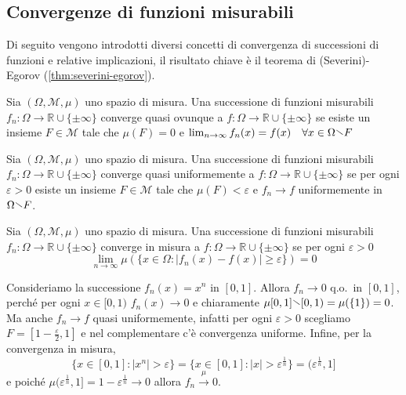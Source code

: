 \subsection{Convergenze di funzioni misurabili}
Di seguito vengono introdotti diversi concetti di convergenza di successioni di funzioni e relative implicazioni, 
il risultato chiave è il teorema di (Severini)-Egorov (\ref{thm:severini-egorov}).
\begin{definition}
    Sia \((\Omega, \mathcal{M}, \mu)\) uno spazio di misura. Una successione di
    funzioni misurabili \(f_{n} : \Omega \to \mathbb{R} \cup \{\pm \infty\} \)
    converge quasi ovunque a \(f : \Omega \to \mathbb{R} \cup \{\pm \infty\} \)
    se esiste un insieme \(F \in \mathcal{M}\) tale che \(\mu(F) = 0\) e
    \(\lim_{n \to \infty} f_{n}(x) = f(x) \quad \forall x \in \Omega \sminus F\)
\end{definition}
\begin{definition}
    Sia \((\Omega, \mathcal{M}, \mu)\) uno spazio di misura. Una successione di
    funzioni misurabili \(f_{n} : \Omega \to \mathbb{R} \cup \{\pm \infty\} \)
    converge quasi uniformemente a \(f : \Omega \to \mathbb{R} \cup \{\pm \infty\} \)
    se per ogni \(\varepsilon > 0\) esiste un insieme \(F \in \mathcal{M}\) tale
    che \(\mu(F) < \varepsilon\) e \(f_{n} \to f\) uniformemente in \(\Omega
    \sminus F\).
\end{definition}
\begin{definition}
    Sia \((\Omega, \mathcal{M}, \mu)\) uno spazio di misura. Una successione di
    funzioni misurabili \(f_{n} : \Omega \to \mathbb{R} \cup \{\pm \infty\} \)
    converge in misura a \(f : \Omega \to \mathbb{R} \cup \{\pm \infty\} \) se
    per ogni \(\varepsilon > 0\) 
    \[
        \lim_{n \to \infty} \mu(\{x \in \Omega : |f_{n}(x) - f(x)| \ge
        \varepsilon\}) = 0
    \]
\end{definition}
\begin{example}
    Consideriamo la successione \(f_{n}{(x)} = x^{n}\) in \([0,1]\). Allora
    \(f_{n} \to 0\) q.o.~in \([0, 1]\), perché per ogni \(x \in [0, 1)\)
    \(f_{n}{(x)} \to 0\) e chiaramente \(\mu{[0,1] \sminus {[0,1)}} =
    \mu{(\{1\} )} = 0\). Ma anche \(f_{n} \to f\) quasi uniformemente, infatti
    per ogni \(\varepsilon > 0\) scegliamo \(F=[1-\frac{\varepsilon}{2} , 1]\) e
    nel complementare c'è convergenza uniforme. Infine, per la convergenza in
    misura, \[
        \{x \in [0,1] : |x^{n}| > \varepsilon\} = \{x \in
        [0,1] : |x| > \varepsilon^{\frac{1}{n}}\} = (\varepsilon^{\frac{1}{n}},
        1]
    \]
    e poiché \(\mu{(\varepsilon^{\frac{1}{n}}, 1]} = 1-\varepsilon^{\frac{1}{n}}
    \to 0\) allora \(f_{n} \overset{\mu}{\to} 0\).
\end{example}
